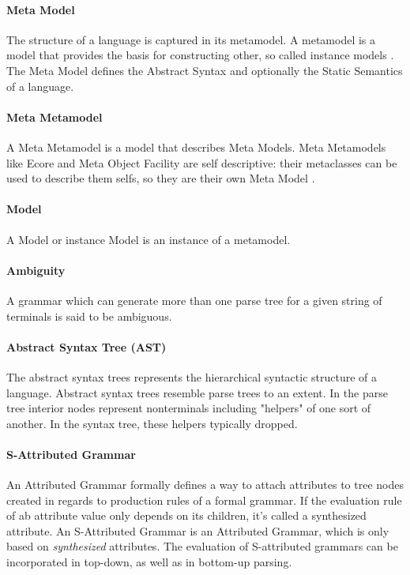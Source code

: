 \paragraph{Meta Model} The structure of a language is captured in its metamodel. A metamodel is a model that provides the basis for constructing other, so called instance models \cite{EMP}. The Meta Model defines the Abstract Syntax and optionally the Static Semantics of a language. \cite{MDSD}

\paragraph{Meta Metamodel} A Meta Metamodel is a model that describes Meta Models. Meta Metamodels like Ecore and Meta Object Facility are self descriptive: their metaclasses can be used to describe them selfs, so they are their own Meta Model \cite{EMF2nd}.

\paragraph{Model} A Model or instance Model is an instance of a metamodel.

\paragraph{Ambiguity} 
A grammar which can generate more than one parse tree for a given string of terminals is said to be ambiguous.\cite{DragonBook}

\paragraph{Abstract Syntax Tree (AST)}  
The abstract syntax trees  represents the hierarchical syntactic structure of a language.  Abstract syntax trees resemble parse trees to an extent. In the parse tree interior nodes represent nonterminals including "helpers" of one sort of another. In the syntax tree, these helpers typically dropped. \cite{DragonBook}

\paragraph{S-Attributed Grammar} 
An Attributed Grammar formally defines a way to attach attributes to tree nodes created in regards to production rules of a formal grammar. If the evaluation rule of ab attribute value only depends on its children, it's called a synthesized attribute. An S-Attributed Grammar is an Attributed Grammar, which is only based on \emph{synthesized} attributes. The evaluation of S-attributed grammars can be incorporated in top-down, as well as in bottom-up parsing. \cite{ParserBook}
 
